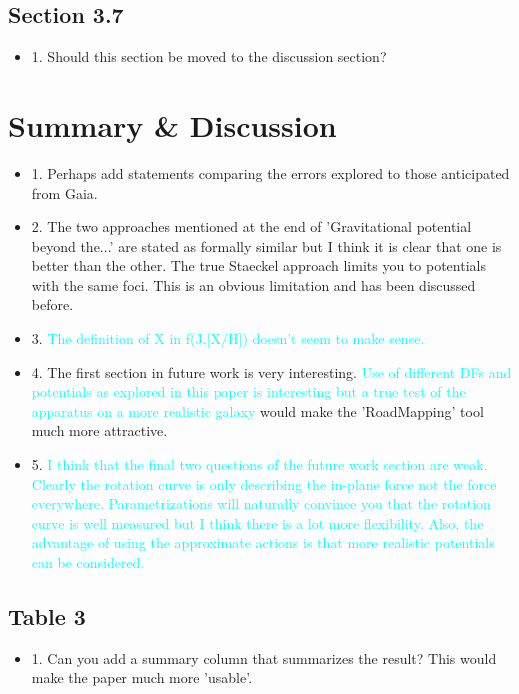 \documentclass[10pt,a4paper]{article}
\newcommand{\HW}[1]{\textcolor{Cyan}{#1}}
\begin{document}
\subsection{Section 3.7}
\begin{itemize}
\item 1. Should this section be moved to the discussion section?
\end{itemize}

\section{Summary \& Discussion}
\begin{itemize}
\item 1. Perhaps add statements comparing the errors explored to those anticipated from Gaia.
\item 2. The two approaches mentioned at the end of 'Gravitational potential beyond the...' are stated as formally similar but I think it is clear that one is better than the other. The true Staeckel approach limits you to potentials with the same foci. This is an obvious limitation and has been discussed before.
\item 3. \HW{The definition of X in f(J,[X/H]) doesn't seem to make sense.}
\item 4. The first section in future work is very interesting. \HW{Use of different DFs and potentials as explored in this paper is interesting but a true test of the apparatus on a more realistic galaxy} would make the 'RoadMapping' tool much more attractive.
\item 5. \HW{I think that the final two questions of the future work section are weak. Clearly the rotation curve is only describing the in-plane force not the force everywhere. Parametrizations will naturally convince you that the rotation curve is well measured but I think there is a lot more flexibility. Also, the advantage of using the approximate actions is that more realistic potentials can be considered.}
\end{itemize}

\subsection{Table 3}
\begin{itemize}
\item 1. Can you add a summary column that summarizes the result? This would make the paper much more 'usable'.
\end{itemize}
\end{document}
